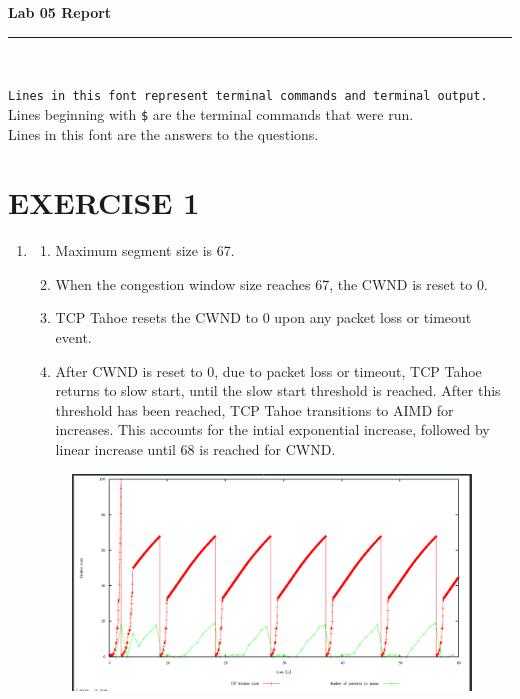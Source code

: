 \documentclass[a4paper,11pt]{article}
\newcommand{\code}{\texttt}
\newcommand{\HRule}{\rule{\linewidth}{0.5mm}} %
\begin{document}
\begin{center}
	\LARGE \textbf{Lab 05 Report}
	\HRule\\
\end{center}


\noindent \code{Lines in this font represent terminal commands and terminal output.}\\
Lines beginning with \code{\$} are the terminal commands that were run.\\
Lines in this font are the answers to the questions.

\section{EXERCISE 1}
\begin{enumerate}[leftmargin=*]
	\item 
		\begin{enumerate}
			\item Maximum segment size is 67.
			\item When the congestion window size reaches 67, the CWND is reset to 0.
			\item TCP Tahoe resets the CWND to 0 upon any packet loss or timeout event.
			\item After CWND is reset to 0, due to packet loss or timeout, TCP Tahoe returns to slow start, until the slow start threshold is reached. After this threshold has been reached, TCP Tahoe transitions to AIMD for increases. This accounts for the intial exponential increase, followed by linear increase until 68 is reached for CWND.
		\end{enumerate}

		\begin{figure}[!htb]
			\centering
		    \includegraphics[width=\linewidth, height=0.43\textheight]{tt1f.png}
		\end{figure}


\end{enumerate}
\end{document}
